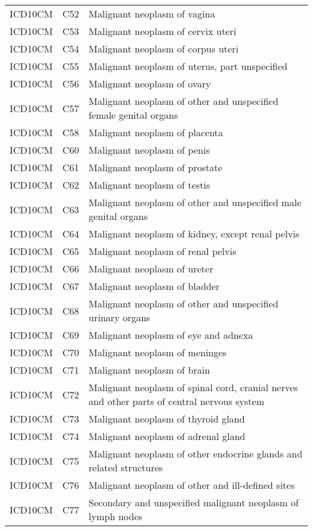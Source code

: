 \begin{longtable}{p{}p{}p{}}
  ICD10CM & C52 & Malignant neoplasm of vagina \\ 
  ICD10CM & C53 & Malignant neoplasm of cervix uteri \\ 
  ICD10CM & C54 & Malignant neoplasm of corpus uteri \\ 
  ICD10CM & C55 & Malignant neoplasm of uterus, part unspecified \\ 
  ICD10CM & C56 & Malignant neoplasm of ovary \\ 
  ICD10CM & C57 & Malignant neoplasm of other and unspecified female genital organs \\ 
  ICD10CM & C58 & Malignant neoplasm of placenta \\ 
  ICD10CM & C60 & Malignant neoplasm of penis \\ 
  ICD10CM & C61 & Malignant neoplasm of prostate \\ 
  ICD10CM & C62 & Malignant neoplasm of testis \\ 
  ICD10CM & C63 & Malignant neoplasm of other and unspecified male genital organs \\ 
  ICD10CM & C64 & Malignant neoplasm of kidney, except renal pelvis \\ 
  ICD10CM & C65 & Malignant neoplasm of renal pelvis \\ 
  ICD10CM & C66 & Malignant neoplasm of ureter \\ 
  ICD10CM & C67 & Malignant neoplasm of bladder \\ 
  ICD10CM & C68 & Malignant neoplasm of other and unspecified urinary organs \\ 
  ICD10CM & C69 & Malignant neoplasm of eye and adnexa \\ 
  ICD10CM & C70 & Malignant neoplasm of meninges \\ 
  ICD10CM & C71 & Malignant neoplasm of brain \\ 
  ICD10CM & C72 & Malignant neoplasm of spinal cord, cranial nerves and other parts of central nervous system \\ 
  ICD10CM & C73 & Malignant neoplasm of thyroid gland \\ 
  ICD10CM & C74 & Malignant neoplasm of adrenal gland \\ 
  ICD10CM & C75 & Malignant neoplasm of other endocrine glands and related structures \\ 
  ICD10CM & C76 & Malignant neoplasm of other and ill-defined sites \\ 
  ICD10CM & C77 & Secondary and unspecified malignant neoplasm of lymph nodes \\ 

\end{longtable}
